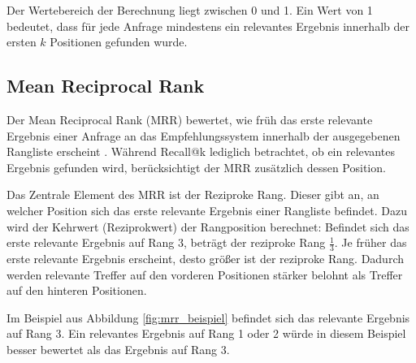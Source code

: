 Der Wertebereich der Berechnung liegt zwischen 0 und 1. Ein Wert von 1 bedeutet, dass für jede Anfrage mindestens ein relevantes Ergebnis innerhalb der ersten $k$ Positionen gefunden wurde. 

\subsection{Mean Reciprocal Rank} 

Der Mean Reciprocal Rank (MRR) bewertet, wie früh das erste relevante Ergebnis einer Anfrage an das Empfehlungssystem innerhalb der ausgegebenen Rangliste erscheint \parencite{voorhees1999mrr,zhu2024llmirsurvey}. 
Während Recall@k lediglich betrachtet, ob ein relevantes Ergebnis gefunden wird, berücksichtigt der MRR zusätzlich dessen Position. 

Das Zentrale Element des MRR ist der Reziproke Rang. Dieser gibt an, an welcher Position sich das erste relevante Ergebnis einer Rangliste befindet. 
Dazu wird der Kehrwert (Reziprokwert) der Rangposition berechnet: Befindet sich das erste relevante Ergebnis auf Rang 3, beträgt der reziproke Rang $\frac{1}{3}$.
Je früher das erste relevante Ergebnis erscheint, desto größer ist der reziproke Rang. 
Dadurch werden relevante Treffer auf den vorderen Positionen stärker belohnt als Treffer auf den hinteren Positionen. \parencite{voorhees1999mrr,zhu2024llmirsurvey}

Im Beispiel aus Abbildung \ref{fig:mrr_beispiel} befindet sich das relevante Ergebnis auf Rang 3.
Ein relevantes Ergebnis auf Rang 1 oder 2 würde in diesem Beispiel besser bewertet als das Ergebnis auf Rang 3.

